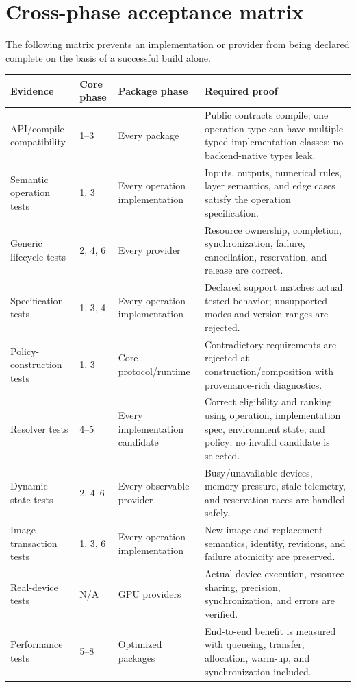 \section{Cross-phase acceptance matrix}

The following matrix prevents an implementation or provider from being declared complete on the basis of a successful build alone.
\begin{longtable}{@{}L{0.22\textwidth}L{0.16\textwidth}L{0.16\textwidth}p{0.35\textwidth}@{}}
\toprule
\textbf{Evidence} & \textbf{Core phase} & \textbf{Package phase} & \textbf{Required proof} \\
\midrule
API/compile compatibility & 1--3 & Every package & Public contracts compile; one operation type can have multiple typed implementation classes; no backend-native types leak. \\
Semantic operation tests & 1, 3 & Every operation implementation & Inputs, outputs, numerical rules, layer semantics, and edge cases satisfy the operation specification. \\
Generic lifecycle tests & 2, 4, 6 & Every provider & Resource ownership, completion, synchronization, failure, cancellation, reservation, and release are correct. \\
Specification tests & 1, 3, 4 & Every operation implementation & Declared support matches actual tested behavior; unsupported modes and version ranges are rejected. \\
Policy-construction tests & 1, 3 & Core protocol/runtime & Contradictory requirements are rejected at construction/composition with provenance-rich diagnostics. \\
Resolver tests & 4--5 & Every implementation candidate & Correct eligibility and ranking using operation, implementation spec, environment state, and policy; no invalid candidate is selected. \\
Dynamic-state tests & 2, 4--6 & Every observable provider & Busy/unavailable devices, memory pressure, stale telemetry, and reservation races are handled safely. \\
Image transaction tests & 1, 3, 6 & Every operation implementation & New-image and replacement semantics, identity, revisions, and failure atomicity are preserved. \\
Real-device tests & N/A & GPU providers & Actual device execution, resource sharing, precision, synchronization, and errors are verified. \\
Performance tests & 5--8 & Optimized packages & End-to-end benefit is measured with queueing, transfer, allocation, warm-up, and synchronization included. \\
\bottomrule
\end{longtable}

